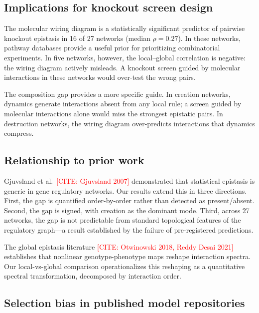 \documentclass[11pt]{article}
\newcommand{\citeneeded}[1]{\textcolor{red}{[CITE: #1]}}
\begin{document}
\subsection{Implications for knockout screen design}

The molecular wiring diagram is a statistically significant predictor
of pairwise knockout epistasis in 16 of 27 networks (median
$\rho = 0.27$). In these networks, pathway databases provide a
useful prior for prioritizing combinatorial experiments. In five
networks, however, the local--global correlation is negative: the
wiring diagram actively misleads. A knockout screen guided by
molecular interactions in these networks would over-test the
wrong pairs.

The composition gap provides a more specific guide. In creation
networks, dynamics generate interactions absent from any local rule;
a screen guided by molecular interactions alone would miss the
strongest epistatic pairs. In destruction networks, the wiring diagram
over-predicts interactions that dynamics compress.

\subsection{Relationship to prior work}

Gjuvsland et al.\ \citeneeded{Gjuvsland 2007} demonstrated that
statistical epistasis is generic in gene regulatory networks. Our
results extend this in three directions. First, the gap is quantified
order-by-order rather than detected as present/absent. Second, the
gap is signed, with creation as the dominant mode. Third, across 27
networks, the gap is not predictable from standard topological
features of the regulatory graph---a result established by the
failure of pre-registered predictions.

The global epistasis literature \citeneeded{Otwinowski 2018, Reddy
Desai 2021} establishes that nonlinear genotype-phenotype maps
reshape interaction spectra. Our local-vs-global comparison
operationalizes this reshaping as a quantitative spectral
transformation, decomposed by interaction order.


\subsection{Selection bias in published model repositories}
\end{document}
